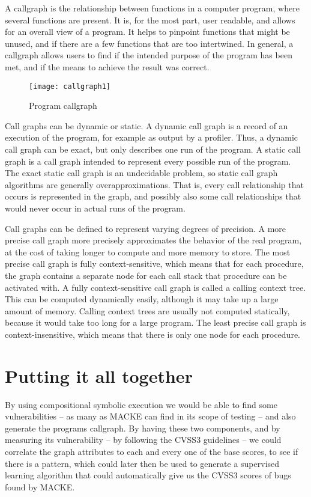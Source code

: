 A callgraph\parencite{dataFlow} is the relationship between functions in a computer program, where several functions are present. It is, for the most part, user readable, and allows for an overall view of a program. It helps to pinpoint functions that might be unused, and if there are a few functions that are too intertwined. In general, a callgraph allows users to find if the intended purpose of the program has been met, and if the means to achieve the result was correct.

\begin{figure}[!htb]
	\caption{Program callgraph}
	\centering
	\texttt{[image: callgraph1]}
\end{figure}

Call graphs can be dynamic or static. A dynamic call graph is a record of an execution of the program, for example as output by a profiler. Thus, a dynamic call graph can be exact, but only describes one run of the program. A static call graph is a call graph intended to represent every possible run of the program. The exact static call graph is an undecidable problem, so static call graph algorithms are generally overapproximations. That is, every call relationship that occurs is represented in the graph, and possibly also some call relationships that would never occur in actual runs of the program.

Call graphs can be defined to represent varying degrees of precision. A more precise call graph more precisely approximates the behavior of the real program, at the cost of taking longer to compute and more memory to store. The most precise call graph is fully context-sensitive, which means that for each procedure, the graph contains a separate node for each call stack that procedure can be activated with. A fully context-sensitive call graph is called a calling context tree. This can be computed dynamically easily, although it may take up a large amount of memory. Calling context trees are usually not computed statically, because it would take too long for a large program. The least precise call graph is context-insensitive, which means that there is only one node for each procedure.


\section{Putting it all together}

By using compositional symbolic execution we would be able to find some vulnerabilities -- as many as MACKE can find in its scope of testing -- and also generate the programs callgraph. By having these two components, and by measuring its vulnerability -- by following the CVSS3 guidelines -- we could correlate the graph attributes to each and every one of the base scores, to see if there is a pattern, which could later then be used to generate a supervised learning algorithm that could automatically give us the CVSS3 scores of bugs found by MACKE. 

